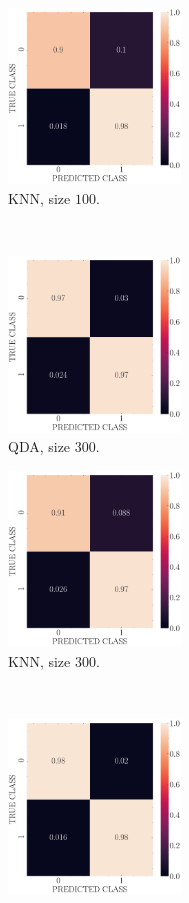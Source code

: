 \documentclass[12pt, a4 paper]{article}
\begin{document}
\begin{figure}[!htbp]
\begin{subfigure}[!htbp]{0.24\textwidth}
       \centering
       \includegraphics[width=1.8in]{../results/ex2/conf_mtx_KNN_dataset_P2a_size_100.pdf}
       \caption{KNN, size $100$.}
       \label{fig:KNN_rr20_P2a_100}
    \end{subfigure}
\\
    \begin{subfigure}[!htbp]{0.24\textwidth}
       \centering
       \includegraphics[width=1.8in]{../results/ex2/conf_mtx_QD_ML_dataset_P2a_size_300.pdf}
       \caption{QDA, size $300$.}
       \label{fig:QDA_rr20_P2a_300}
    \end{subfigure}
\quad \quad   
    \begin{subfigure}[!htbp]{0.24\textwidth}
       \centering
       \includegraphics[width=1.8in]{../results/ex2/conf_mtx_KNN_dataset_P2a_size_300.pdf}
       \caption{KNN, size $300$.}
       \label{fig:KNN_rr20_P2a_300}
    \end{subfigure}
\\
    \begin{subfigure}[!htbp]{0.24\textwidth}
       \centering
       \includegraphics[width=1.8in]{../results/ex2/conf_mtx_QD_ML_dataset_P2a_size_999.pdf}

\end{subfigure}
\end{figure}
\end{document}
